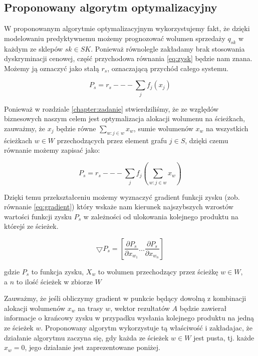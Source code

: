 \documentclass[polish, twoside, 12pt, a4paper]{article}
\theoremstyle{definition}
\theoremstyle{plain}
\theoremstyle{remark}
\begin{document}
\subsection{Proponowany algorytm optymalizacyjny} \label{chapter:algorytm}

W proponowanym algorytmie optymalizacyjnym wykorzystujemy fakt, że dzięki modelowaniu predyktywnemu możemy prognozować wolumen sprzedaży $q_{sk}$ w każdym ze sklepów $sk \in SK$. Ponieważ równolegle zakładamy brak stosowania dyskryminacji cenowej, część przychodowa równania \ref{eq:zysk} będzie nam znana. Możemy ją oznaczyć jako stałą $r_s$, oznaczającą  przychód całego systemu.  

\begin{equation} \label{eq:przychodsystemu}
P_s = r_s --- \sum\limits_{j} f_j(x_j)
\end{equation}

Ponieważ w rozdziale \ref{chapter:zadanie} stwierdziliśmy, że ze względów biznesowych naszym celem jest optymalizacja alokacji wolumenu na ścieżkach, zauważmy, że $x_j$ będzie równe $\sum\limits_{w:j \in w} x_w$, sumie wolumenów $x_w$ na wszystkich ścieżkach $w \in W$ przechodzących przez element grafu $j \in S$, dzięki czemu równanie \label{eq:przychodsystemu} możemy zapisać jako: 

\begin{equation} \label{eq:przychodsystemu}
P_s = r_s --- \sum\limits_{j} f_j(\sum\limits_{w:j \in w} x_w)
\end{equation}

Dzięki temu przekształceniu możemy wyznaczyć gradient funkcji zysku (zob. równanie \ref{eq:gradient}) który wskaże nam kierunek najszybszych wzrostów wartości funkcji zysku $P_s$ w zależności od ulokowania kolejnego produktu na którejś ze ścieżek.

\begin{equation} \label{eq:gradient}
\bigtriangledown P_s  = [\frac{\partial P_s}{\partial x_{w_1}}...\frac{\partial P_s}{\partial x_{w_n}}]
\end{equation}
\begin{center} gdzie $P_s$ to funkcja zysku, $X_w$ to wolumen przechodzący przez ścieżkę $w \in W$, \\ a $n$ to ilość ścieżek w zbiorze $W$ \end{center}

Zauważmy, że jeśli obliczymy gradient w punkcie będący dowolną z kombinacji alokacji wolumenów $x_w$ na trasy $w$, wektor rezultatów $A$ będzie zawierał informacje  o krańcowy zysku w przypadku wysłania kolejnego produktu na jedną ze ścieżek $w$. Proponowany algorytm wykorzystuje tą właściwość i zakładajac, że działanie algorytmu zaczyna się, gdy każda ze ścieżek $w \in W$ jest pusta, tj. każde $x_{w}=0$, jego działanie jest zaprezentowane poniżej.
\end{document}
